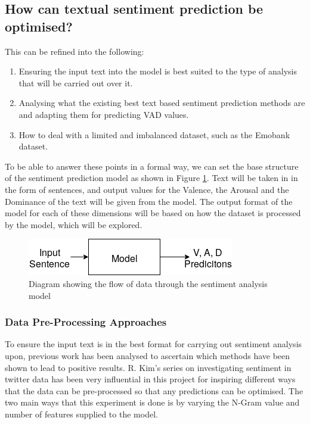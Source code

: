 \subsection{How can textual sentiment prediction be optimised?}

This can be refined into the following: 

\begin{enumerate}
    \item Ensuring the input text into the model is best suited to the type of analysis that will be carried out over it. 
    \item Analysing what the existing best text based sentiment prediction methods are and adapting them for predicting VAD values. 
    \item How to deal with a limited and imbalanced dataset, such as the Emobank dataset.
\end{enumerate}

To be able to answer these points in a formal way, we can set the base structure of the sentiment prediction model as shown in Figure \ref{intial:flow}. 
Text will be taken in in the form of sentences, and output values for the Valence, the Arousal and the Dominance of the text will be given from the model. The output format of the model for each of these dimensions will be based on how the dataset is processed by the model, which will be explored.

\begin{figure}[h]
\centering
\includegraphics[scale=0.5]{litImgs/initialFlow.png}
\caption{Diagram showing the flow of data through the sentiment analysis model}
\label{intial:flow}
\end{figure}


\subsubsection{Data Pre-Processing Approaches}

To ensure the input text is in the best format for carrying out sentiment analysis upon, previous work has been analysed to ascertain which methods have been shown to lead to positive results.
R. Kim's series on investigating sentiment in twitter data \cite{towardsDS} has been very influential in this project for inspiring different ways that the data can be pre-processed so that any predictions can be optimised.
The two main ways that this experiment is done is by varying the N-Gram value and number of features supplied to the model.

